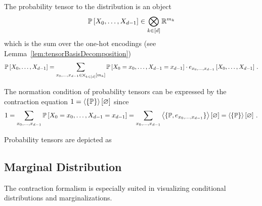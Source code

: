 The probability tensor to the distribution is an object
		\[ \mathbb{P}\left[X_{0},\ldots,X_{d-1}\right] \in \bigotimes_{k\in[d]}\mathbb{R}^{m_{k}} \]
which is the sum over the one-hot encodings (see Lemma~\ref{lem:tensorBasisDecomposition})
		\[ \mathbb{P}\left[X_{0},\ldots,X_{d-1}\right] = \sum_{x_{0},\ldots,x_{d-1}\in\bigtimes_{k\in[d]}[m_{k}]} \mathbb{P}\left[X_{0}=x_{0},\ldots,X_{d-1}=x_{d-1}\right] \cdot e_{x_{0},\ldots,x_{d-1}}\left[X_{0},\ldots,X_{d-1}\right] \, . \]
		
The normation condition of probability tensors can be expressed by the contraction equation $1= \left\langle \{\mathbb{P}\}\right\rangle \left[ \varnothing \right]$ since
\begin{align*}
	1 = \sum_{x_{0},\ldots,x_{d-1}}\mathbb{P}\left[X_{0}=x_{0},\ldots,X_{d-1}=x_{d-1}\right]
	=  \sum_{x_{0},\ldots,x_{d-1}}\left\langle \{\mathbb{P}, e_{x_{0},\ldots,x_{d-1}}\}\right\rangle \left[ \varnothing \right] 
	= \left\langle \{\mathbb{P}\}\right\rangle \left[ \varnothing \right] \, . 
\end{align*}





Probability tensors are depicted as
	\begin{center}
		
	\end{center}




\subsection{Marginal Distribution}

The contraction formalism is especially suited in visualizing conditional distributions and marginalizations.


